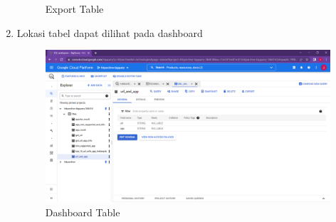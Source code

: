 \begin{enumerate}
\begin{figure}[H]
		\caption{Export Table} 
		\label{fig:export_table}
	\end{figure}
	\item Lokasi tabel dapat dilihat pada dashboard
		\begin{figure}[H]
		\centering  
		\includegraphics[scale=0.35]{Gambar/saved dashboard.PNG}  
		\caption{Dashboard Table} 
		\label{fig:lokasi_table}
	\end{figure}
\end{enumerate}

